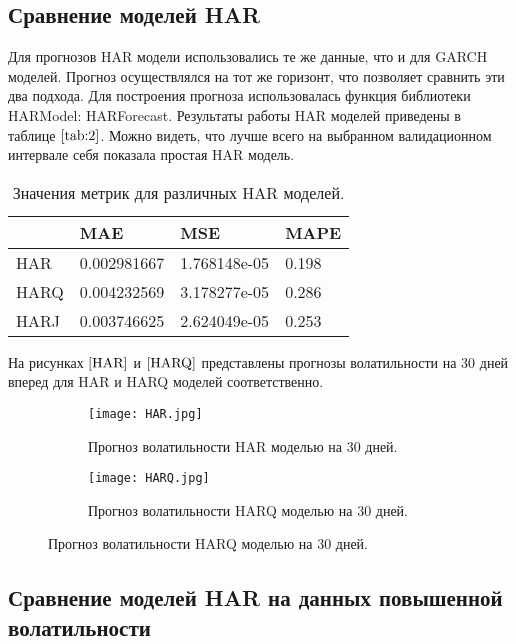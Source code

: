 \documentclass[]{article}
\begin{document}
\subsection{Сравнение моделей HAR}

Для прогнозов HAR модели использовались те же данные, что и для GARCH моделей. Прогноз осуществлялся на тот же горизонт, что позволяет сравнить эти два подхода. Для построения прогноза использовалась функция библиотеки HARModel: HARForecast. Результаты работы HAR моделей приведены в таблице $\ref{tab:2}$. Можно видеть, что лучше всего на выбранном валидационном интервале себя показала простая HAR модель.

\begin{table}[h!]
	\centering
	\caption{Значения метрик для различных HAR моделей.}
	\begin{tabularx}{\textwidth}{|X|X|X|X|}
		\hline
		       &   MAE        & MSE       & MAPE    \\ \hline
		HAR    & 0.002981667  & 1.768148e-05  & 0.198    \\ \hline
		HARQ   & 0.004232569  & 3.178277e-05  & 0.286    \\ \hline
		HARJ   & 0.003746625  & 2.624049e-05  & 0.253    \\ \hline
	\end{tabularx}
	\label{tab:2}
\end{table}

На рисунках $\ref{HAR}$ и $\ref{HARQ}$ представлены прогнозы волатильности на 30 дней вперед для HAR и HARQ моделей соответственно.


\begin{figure}[h!]
	\centering
	\begin{subfigure}{0.49\textwidth}
		\texttt{[image: HAR.jpg]}
		\caption{Прогноз волатильности HAR моделью на 30 дней.}
		\label{HAR}
	\end{subfigure}
	\hfill
	\begin{subfigure}{0.49\textwidth}
		\texttt{[image: HARQ.jpg]}
		\caption{Прогноз волатильности HARQ моделью на 30 дней.}
		\label{HARQ}
	\end{subfigure}
	\label{fig:both_images}
\end{figure}


\subsection{Сравнение моделей HAR на данных повышенной волатильности}
\end{document}
